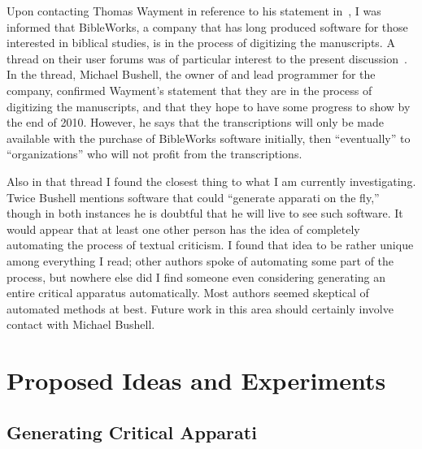 \documentclass[onecolumn, 12pt]{article}
\begin{document}
Upon contacting Thomas Wayment in reference to his statement
in~\cite{holzapfel-2006-jesus-christ-new-testament}, I was informed that
BibleWorks, a company that has long produced software for those interested in
biblical studies, is in the process of digitizing the manuscripts.  A thread on
their user forums was of particular interest to the present
discussion~\cite{bible-works-forum}.  In the thread, Michael Bushell, the owner
of and lead programmer for the company, confirmed Wayment's statement that they
are in the process of digitizing the manuscripts, and that they hope to have
some progress to show by the end of 2010.  However, he says that the
transcriptions will only be made available with the purchase of BibleWorks
software initially, then ``eventually'' to ``organizations'' who will not
profit from the transcriptions.

Also in that thread I found the closest thing to what I am currently
investigating.  Twice Bushell mentions software that could ``generate apparati
on the fly,'' though in both instances he is doubtful that he will live to see
such software.  It would appear that at least one other person has the idea of
completely automating the process of textual criticism.  I found that idea to
be rather unique among everything I read; other authors spoke of automating
some part of the process, but nowhere else did I find someone even considering
generating an entire critical apparatus automatically.  Most authors seemed
skeptical of automated methods at best.  Future work in this area should
certainly involve contact with Michael Bushell.

\section{Proposed Ideas and Experiments}
\label{sec:proposed-ideas}

\subsection{Generating Critical Apparati}
\end{document}
